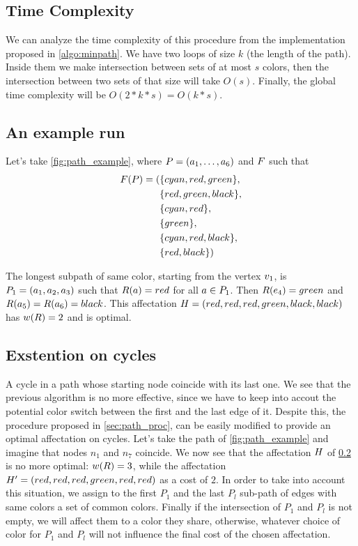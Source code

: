 \subsection{Time Complexity}

We can analyze the time complexity of this procedure from the implementation proposed in \cref{algo:minpath}. We have two loops of size $k$ (the length of the path). Inside them we make intersection between sets of at most $s$ colors, then the intersection between two sets of that size will take $O(s)$. Finally, the global time complexity will be $O(2 * k * s) = O(k*s)$.

\subsection{An example run}
\label{sec:path_ex_run}



Let's take \cref{fig:path_example}, where $P = (a_1,\ldots,a_{6})$ and $F$ such that
\begin{align*}
  F(P) = ( & \{cyan,red,green\},    \\
                   & \{red,green,black\},    \\
                   & \{cyan,red\},    \\
                   & \{green\},    \\
                   & \{cyan,red,black\},    \\
                   & \{red,black\}   )
\end{align*}

The longest subpath of same color, starting from the vertex $v_1$, is $P_1 = (a_1, a_2, a_3)$ such that $R(a) = red$ for all $a \in P_1$. Then $R(e_4) = green$ and $R(a_5) = R(a_6) = black$. This affectation $H = (red, red, red, green, black, black)$ has $w(R) = 2$ and is optimal.

\subsection{Exstention on cycles}

A cycle in a path whose starting node coincide with its last one.
We see that the previous algorithm is no more effective, since we have to keep into accout the potential color switch between the first and the last edge of it.
Despite this, the procedure proposed in \cref{sec:path_proc}, can be easily modified to provide an optimal affectation on cycles.
Let's take the path of \cref{fig:path_example} and imagine that nodes $n_1$ and $n_7$ coincide.
We now see that the affectation $H$ of \cref{sec:path_ex_run} is no more optimal: $w(R) = 3$, while the affectation $H' = (red, red, red, green, red, red)$ as a cost of $2$.
In order to take into account this situation, we assign to the first $P_1$ and the last $P_l$ sub-path of edges with same colors a set of common colors. Finally if the intersection of $P_1$ and $P_l$ is not empty, we will affect them to a color they share, otherwise, whatever choice of color for $P_1$ and $P_l$ will not influence the final cost of the chosen affectation.

